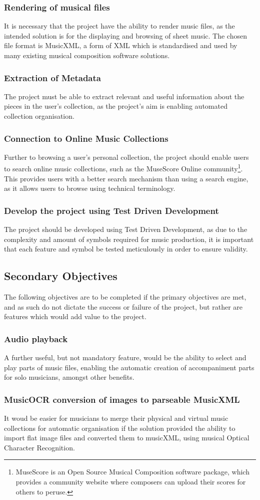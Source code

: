 \subsubsection{Rendering of musical files}
It is necessary that the project have the ability to render music files, as the intended solution is for the displaying and browsing of sheet music. The chosen file format is MusicXML, a form of XML which is standardised and used by many existing musical composition software solutions.
\subsubsection{Extraction of Metadata}
The project must be able to extract relevant and useful information about the pieces in the user's collection, as the project's aim is enabling automated collection organisation. 
\subsubsection{Connection to Online Music Collections}
Further to browsing a user's personal collection, the project should enable users to search online music collections, such as the MuseScore Online community\footnote{MuseScore is an Open Source Musical Composition software package, which provides a community website where composers can upload their scores for others to peruse.}. This provides users with a better search mechanism than using a search engine, as it allows users to browse using technical terminology.
\subsubsection{Develop the project using Test Driven Development}
The project should be developed using Test Driven Development, as due to the complexity and amount of symbols required for music production, it is important that each feature and symbol be tested meticulously in order to ensure validity.
\subsection{Secondary Objectives}
The following objectives are to be completed if the primary objectives are met, and as such do not dictate the success or failure of the project, but rather are features which would add value to the project.
\subsubsection{Audio playback}
A further useful, but not mandatory feature, would be the ability to select and play parts of music files, enabling the automatic creation of accompaniment parts for solo musicians, amongst other benefits.
\subsubsection{MusicOCR conversion of images to parseable MusicXML}
It woud be easier for musicians to merge their physical and virtual music collections for automatic organisation if the solution provided the ability to import flat image files and converted them to musicXML, using musical Optical Character Recognition. 

